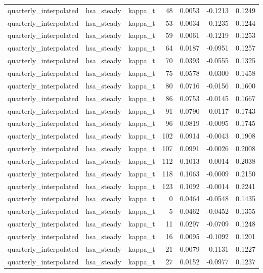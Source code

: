 \begin{tabular}{lllrrrr}
quarterly\_interpolated & hsa\_steady & kappa\_t & 48 & 0.0053 & -0.1213 & 0.1249 \\
quarterly\_interpolated & hsa\_steady & kappa\_t & 53 & 0.0034 & -0.1235 & 0.1244 \\
quarterly\_interpolated & hsa\_steady & kappa\_t & 59 & 0.0061 & -0.1219 & 0.1253 \\
quarterly\_interpolated & hsa\_steady & kappa\_t & 64 & 0.0187 & -0.0951 & 0.1257 \\
quarterly\_interpolated & hsa\_steady & kappa\_t & 70 & 0.0393 & -0.0555 & 0.1325 \\
quarterly\_interpolated & hsa\_steady & kappa\_t & 75 & 0.0578 & -0.0300 & 0.1458 \\
quarterly\_interpolated & hsa\_steady & kappa\_t & 80 & 0.0716 & -0.0156 & 0.1600 \\
quarterly\_interpolated & hsa\_steady & kappa\_t & 86 & 0.0753 & -0.0145 & 0.1667 \\
quarterly\_interpolated & hsa\_steady & kappa\_t & 91 & 0.0790 & -0.0117 & 0.1743 \\
quarterly\_interpolated & hsa\_steady & kappa\_t & 96 & 0.0819 & -0.0095 & 0.1745 \\
quarterly\_interpolated & hsa\_steady & kappa\_t & 102 & 0.0914 & -0.0043 & 0.1908 \\
quarterly\_interpolated & hsa\_steady & kappa\_t & 107 & 0.0991 & -0.0026 & 0.2008 \\
quarterly\_interpolated & hsa\_steady & kappa\_t & 112 & 0.1013 & -0.0014 & 0.2038 \\
quarterly\_interpolated & hsa\_steady & kappa\_t & 118 & 0.1063 & -0.0009 & 0.2150 \\
quarterly\_interpolated & hsa\_steady & kappa\_t & 123 & 0.1092 & -0.0014 & 0.2241 \\
quarterly\_interpolated & hsa\_steady & kappa\_t & 0 & 0.0464 & -0.0548 & 0.1435 \\
quarterly\_interpolated & hsa\_steady & kappa\_t & 5 & 0.0462 & -0.0452 & 0.1355 \\
quarterly\_interpolated & hsa\_steady & kappa\_t & 11 & 0.0297 & -0.0709 & 0.1248 \\
quarterly\_interpolated & hsa\_steady & kappa\_t & 16 & 0.0095 & -0.1092 & 0.1201 \\
quarterly\_interpolated & hsa\_steady & kappa\_t & 21 & 0.0079 & -0.1131 & 0.1227 \\
quarterly\_interpolated & hsa\_steady & kappa\_t & 27 & 0.0152 & -0.0977 & 0.1237 \\

\end{tabular}
